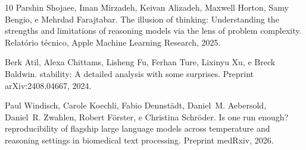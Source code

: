 \documentclass[12pt,a4paper]{article}
\begin{document}
\begin{thebibliography}{10}
Parshin Shojaee, Iman Mirzadeh, Keivan Alizadeh, Maxwell Horton, Samy Bengio,
  e Mehrdad Farajtabar.
\newblock The illusion of thinking: Understanding the strengths and
  limitations of reasoning models via the lens of problem complexity.
\newblock Relatório técnico, Apple Machine Learning Research, 2025.

Berk Atil, Alexa Chittams, Lisheng Fu, Ferhan Ture, Lixinyu Xu, e Breck Baldwin.
 stability: A detailed analysis with some surprises.
\newblock Preprint arXiv:2408.04667, 2024.

Paul Windisch, Carole Koechli, Fabio Dennstädt, Daniel~M. Aebersold,
  Daniel~R. Zwahlen, Robert Förster, e Christina Schröder.
\newblock Is one run enough? reproducibility of flagship large language models
  across temperature and reasoning settings in biomedical text processing.
\newblock Preprint medRxiv, 2026.

\end{thebibliography}
\end{document}
